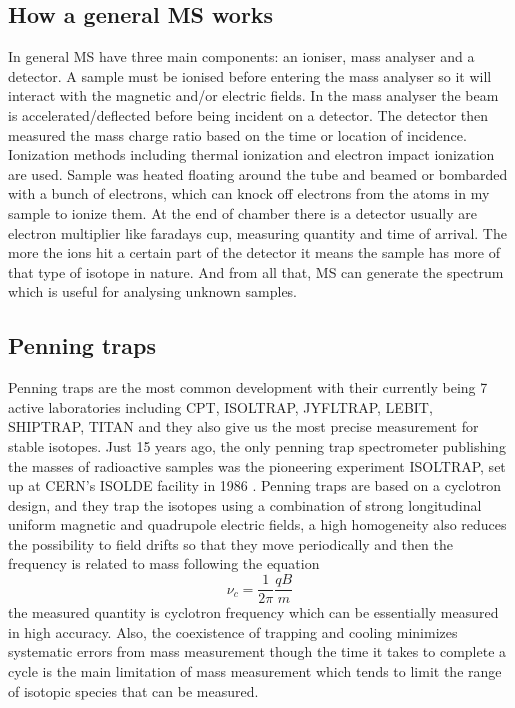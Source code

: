 \subsection{How a general MS works}
In general MS have three main components: an ioniser, mass analyser and a detector.
A sample must be ionised before entering the mass analyser so it will interact with the magnetic and/or electric fields.
In the mass analyser the beam is accelerated/deflected before being incident on a detector.
The detector then measured the mass charge ratio based on the time or location of incidence. \cite{noauthor_mass_nodate}
Ionization methods including thermal ionization and electron impact ionization are used.
Sample was heated floating around the tube and beamed or bombarded with a bunch of electrons, which can knock off electrons from the atoms in my sample to ionize them.
At the end of chamber there is a detector usually are electron multiplier like faradays cup, measuring quantity and time of arrival.
The more the ions hit a certain part of the detector it means the sample has more of that type of isotope in nature.
And from all that, MS can generate the spectrum which is useful for analysing unknown samples.

\subsection{Penning traps}
Penning traps are the most common development with their currently being 7 active laboratories including CPT, ISOLTRAP, JYFLTRAP, LEBIT, SHIPTRAP, TITAN and they also give us the most precise measurement for stable isotopes.
Just 15 years ago, the only penning trap spectrometer publishing the masses of radioactive samples was the pioneering experiment ISOLTRAP, set up at CERN’s ISOLDE facility in 1986 \cite{lunney_new_2019}.
Penning traps are based on a cyclotron design, and they trap the isotopes using a combination of strong longitudinal uniform magnetic and quadrupole electric fields, a high homogeneity also reduces the possibility to field drifts so that they move periodically and then the frequency is related to mass following the equation
\begin{equation}
    \nu_c = \frac{1}{2\pi}\frac{qB}{m}
\end{equation}
the measured quantity is cyclotron frequency which can be essentially measured in high accuracy.
Also, the coexistence of trapping and cooling minimizes systematic errors from mass measurement though the time it takes to complete a cycle is the main limitation of mass measurement which tends to limit the range of isotopic species that can be measured. \cite{famiano_nuclear_2019}

